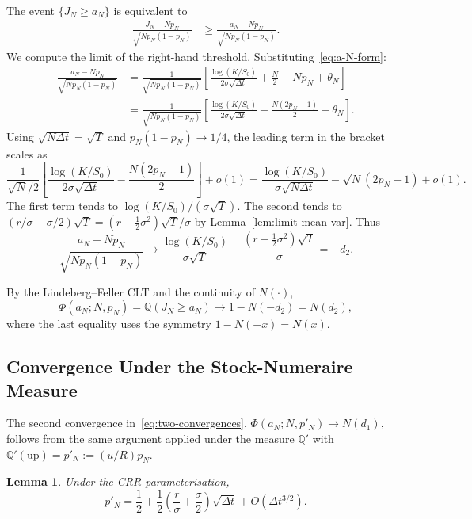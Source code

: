 \documentclass[11pt,a4paper]{article}
\theoremstyle{plain}
\newtheorem{lemma}[theorem]{Lemma}
\theoremstyle{definition}
\newcommand{\Q}{\mathbb{Q}}
\begin{document}
The event $\{J_N \geq a_N\}$ is equivalent to
\begin{align}
    \frac{J_N - N p_N}{\sqrt{N p_N(1-p_N)}}
    &\geq \frac{a_N - N p_N}{\sqrt{N p_N(1-p_N)}}.
\end{align}
We compute the limit of the right-hand threshold. Substituting~\eqref{eq:a-N-form}:
\begin{align*}
    \frac{a_N - N p_N}{\sqrt{N p_N(1-p_N)}}
    &= \frac{1}{\sqrt{N p_N(1-p_N)}}
       \left[\frac{\log(K/S_0)}{2 \sigma \sqrt{\Delta t}}
             + \frac{N}{2} - N p_N + \theta_N \right] \\
    &= \frac{1}{\sqrt{N p_N(1-p_N)}}
       \left[\frac{\log(K/S_0)}{2 \sigma \sqrt{\Delta t}}
             - \frac{N(2 p_N - 1)}{2} + \theta_N \right].
\end{align*}
Using $\sqrt{N \Delta t} = \sqrt{T}$ and $p_N(1-p_N) \to 1/4$, the leading
term in the bracket scales as
\[
\frac{1}{\sqrt{N}/2}\!\left[\frac{\log(K/S_0)}{2 \sigma \sqrt{\Delta t}}
   - \frac{N(2 p_N - 1)}{2}\right] + o(1)
= \frac{\log(K/S_0)}{\sigma \sqrt{N \Delta t}}
   - \sqrt{N}(2 p_N - 1) + o(1).
\]
The first term tends to $\log(K/S_0)/(\sigma \sqrt{T})$. The second
tends to $(r/\sigma - \sigma/2)\sqrt{T} = (r - \tfrac{1}{2}\sigma^2)\sqrt{T}/\sigma$
by Lemma~\ref{lem:limit-mean-var}. Thus
\begin{equation}
    \label{eq:threshold-limit}
    \frac{a_N - N p_N}{\sqrt{N p_N(1-p_N)}}
    \to \frac{\log(K/S_0)}{\sigma\sqrt{T}}
        - \frac{(r - \tfrac{1}{2}\sigma^2)\sqrt{T}}{\sigma}
    = -d_2.
\end{equation}

By the Lindeberg--Feller CLT and the continuity of $N(\cdot)$,
\[
\Phi(a_N; N, p_N) = \Q(J_N \geq a_N)
\to 1 - N(-d_2) = N(d_2),
\]
where the last equality uses the symmetry $1 - N(-x) = N(x)$.

\subsection{Convergence Under the Stock-Numeraire Measure}
\label{subsec:p-prime}

The second convergence in~\eqref{eq:two-convergences},
$\Phi(a_N; N, p'_N) \to N(d_1)$, follows from the same argument applied
under the measure $\Q'$ with $\Q'(\text{up}) = p'_N := (u/R) p_N$.

\begin{lemma}
\label{lem:p-prime-asymptotic}
Under the CRR parameterisation,
\begin{equation}
    \label{eq:p-prime-expansion}
    p'_N = \frac{1}{2} + \frac{1}{2}\!\left(\frac{r}{\sigma} + \frac{\sigma}{2}\right)
            \sqrt{\Delta t} + O(\Delta t^{3/2}).
\end{equation}
\end{lemma}
\end{document}
